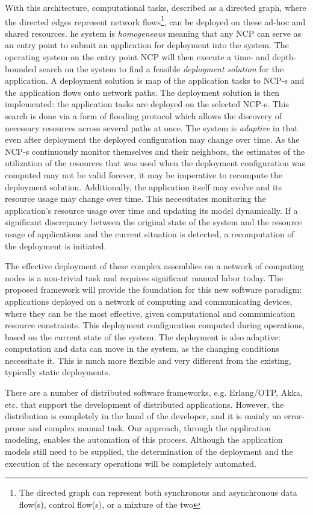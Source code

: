 \documentclass[12pt,letterpaper]{article}
\begin{document}
With this architecture, computational tasks, described as  a directed graph, where the directed edges represent network flows\footnote{The directed graph can represent both synchronous and asynchronous data flow(s), control flow(s), or a mixture of the two}, can be deployed on these ad-hoc and shared resources. he system is \textit{homogeneous} meaning that any NCP can serve as an entry point to submit an application for deployment into the system. The operating system on the entry point NCP will then execute a time- and depth-bounded search on the system to find a feasible \textit{deployment solution} for the application. A deployment solution is map of the application tasks to NCP-s and the application flows onto network paths. The deployment solution is then implemented: the application tasks are deployed on the selected NCP-s. This search is done via a form of flooding protocol which allows the discovery of necessary resources across several paths at once.  The system is \textit{adaptive} in that even after deployment the deployed configuration may change over time. As the NCP-s continuously monitor themselves and their neighbors, the estimates of the utilization of the resources that was used when the deployment configuration was computed may not be valid forever, it may be imperative to recompute the deployment solution. Additionally, the application itself may evolve and its resource usage may change over time. This necessitates monitoring the application's resource usage over time and updating its model dynamically. If a significant discrepancy between the original state of the system and the resource usage of applications and the current situation is detected, a recomputation of the deployment is initiated.  

The effective deployment of these complex assemblies on a network of computing nodes is a non-trivial task and requires significant manual labor today. The proposed framework will provide the foundation for this new software paradigm: applications deployed on a network of computing and communicating devices, where they can be the most effective, given computational and communication resource constraints. This deployment configuration computed during operations, based on the current state of the system. The deployment is also adaptive: computation and data can move in the system, as the changing conditions necessitate it. This is much more flexible and very different from the existing, typically static deployments. 

There are a number of distributed software frameworks, e.g. Erlang/OTP, Akka, etc. that support the development of distributed applications. However, the distribution is completely in the hand of the developer, and it is mainly an error-prone and complex manual task. Our approach, through the application modeling, enables the automation of this process. Although the application models still need to be supplied, the determination of the deployment and the execution of the necessary operations will be completely automated. 
\end{document}
